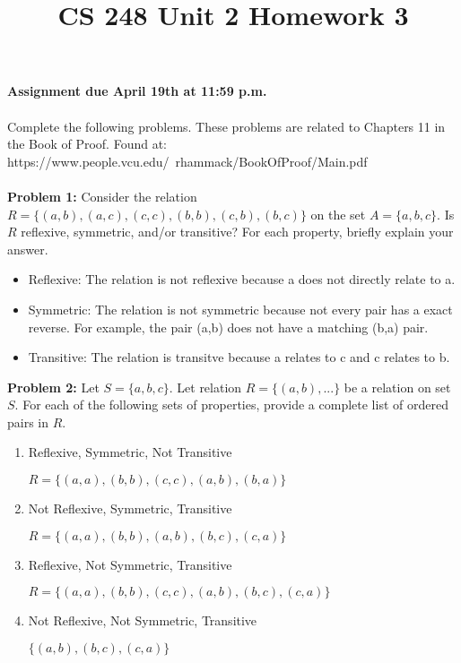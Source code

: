 \documentclass[12pt]{article}
\title{CS 248 Unit 2 Homework 3}
\begin{document}
\textbf{Assignment due April 19th at 11:59 p.m. \\ \\
}Complete the following problems. These problems are related to Chapters 11 in the Book of Proof. Found at: \\ https://www.people.vcu.edu/~rhammack/BookOfProof/Main.pdf \\ \\

{\bf Problem 1:} Consider the relation $R=\{(a,b), (a,c), (c,c), (b,b), (c,b), (b,c)\}$ on the set $A= \{a, b, c\}.$ Is $R$ reflexive, symmetric, and/or transitive? For each property, briefly explain your answer. \\

    \begin{itemize}

        \item Reflexive: The relation is not reflexive because a does not directly relate to a.
        \item Symmetric: The relation is not symmetric because not every pair has a exact reverse. For example, the pair (a,b) does not have a matching (b,a) pair.
        \item Transitive: The relation is transitve because a relates to c and c relates to b.
    \end{itemize}

{\bf Problem 2:} Let $S = \{a, b, c\}.$ Let relation $R = \{(a,b), ...\}$ be a relation on set $S$. For each of the following sets of properties, provide a complete list of ordered pairs in $R$.
\begin{enumerate}
    \item Reflexive, Symmetric, Not Transitive
    
        $R = \{(a,a),(b,b),(c,c),(a,b),(b,a)\}$

    \item Not Reflexive, Symmetric, Transitive
    
        $R = \{(a,a),(b,b),(a,b),(b,c),(c,a)\}$

    \item Reflexive, Not Symmetric, Transitive
    
        $R = \{(a,a),(b,b),(c,c),(a,b),(b,c),(c,a)\}$

    \item Not Reflexive, Not Symmetric, Transitive
    
        $\{(a,b),(b,c),(c,a)\}$

\end{enumerate} 
\end{document}
